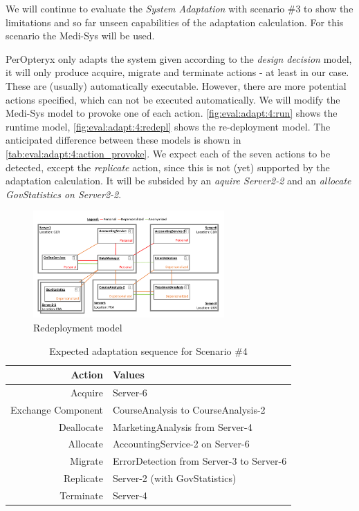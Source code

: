 We will continue to evaluate the \textit{System Adaptation} with scenario \#3 to show the limitations and so far unseen capabilities of the adaptation calculation. For this scenario the Medi-Sys will be used.

PerOpteryx only adapts the system given according to the \textit{design decision} model, it will only produce acquire, migrate and terminate actions - at least in our case. These are (usually) automatically executable. However, there are more potential actions specified, which can not be executed automatically. We will modify the Medi-Sys model to provoke one of each action. \autoref{fig:eval:adapt:4:run} shows the runtime model, \autoref{fig:eval:adapt:4:redepl} shows the re-deployment model. The anticipated difference between these models is shown in \autoref{tab:eval:adapt:4:action_provoke}. We expect each of the seven actions to be detected, except the \textit{replicate} action, since this is not (yet) supported by the adaptation calculation. It will be subsided by an \textit{aquire Server2-2} and an \textit{allocate GovStatistics on Server2-2}.

\begin{figure}[h]
	\centering
	\includegraphics[trim = 5mm 5mm 10mm 10mm, clip, width=0.65\textwidth]{graphs/medSystem_adap_calc_all_redepl}
	\caption{Redeployment model}
	\label{fig:eval:adapt:4:redepl}
\end{figure}

\begin{table}[h]
	\centering
	\begin{tabular}{r | l }
		\hline
		\textbf{Action} & \textbf{Values}\\
		\hline
		Acquire & Server-6\\
		Exchange Component & CourseAnalysis to CourseAnalysis-2\\
		Deallocate & MarketingAnalysis from Server-4\\
		Allocate & AccountingService-2 on Server-6\\
		Migrate & ErrorDetection from Server-3 to Server-6\\
		Replicate & Server-2 (with GovStatistics)\\
		Terminate & Server-4\\
		\hline
	\end{tabular}
	\caption{Expected adaptation sequence for Scenario \#4}
	\label{tab:eval:adapt:4:action_provoke}
\end{table}

